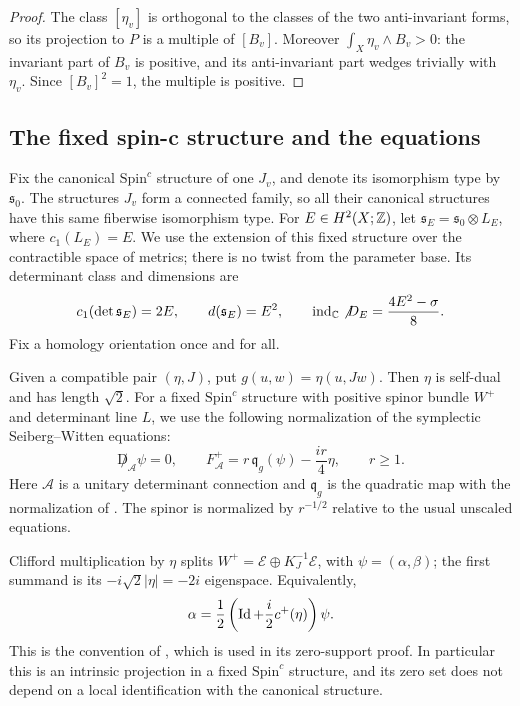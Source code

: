 \begin{proof}
The class \([\eta_v]\) is orthogonal to the classes of the two
anti-invariant forms, so its projection to \(P\) is a multiple of
\([B_v]\).  Moreover
\(\int_X\eta_v\wedge B_v>0\): the invariant part of \(B_v\) is
positive, and its anti-invariant part wedges trivially with
\(\eta_v\).  Since \([B_v]^2=1\), the multiple is positive.
\end{proof}

\subsection{The fixed spin-c structure and the equations}

Fix the canonical \(\mathrm{Spin}^c\) structure of one \(J_v\),
and denote its isomorphism type by \(\mathfrak s_0\).
The structures \(J_v\) form a connected family, so all their
canonical structures have this same fiberwise isomorphism type.
For \(E\in H^2(X;\mathbb Z)\), let
\(\mathfrak s_E=\mathfrak s_0\otimes L_E\), where
\(c_1(L_E)=E\).
We use the extension of this fixed structure
over the contractible space of metrics; there is no twist from the
parameter base.  Its determinant class and dimensions are
\begin{equation}
 \label{eq:families-dimensions}
 c_1(\det\mathfrak s_E)=2E,
 \qquad d(\mathfrak s_E)=E^2,
 \qquad \operatorname{ind}_{\mathbb C}\not D_E
            =\frac{4E^2-\sigma}{8}.
\end{equation}
Fix a homology orientation once and for all.

Given a compatible pair \((\eta,J)\), put
\(g(u,w)=\eta(u,Jw)\).  Then \(\eta\) is self-dual and has length
\(\sqrt2\).  For a fixed \(\mathrm{Spin}^c\) structure with positive
spinor bundle \(W^+\) and determinant line \(L\), we use the
following normalization of the symplectic Seiberg--Witten equations:
\begin{equation}
 \label{eq:families-taubes-equations}
 \not D_{\mathcal A}\psi=0,
 \qquad
 F_{\mathcal A}^{+}
   =r\,\mathfrak q_g(\psi)-\frac{ir}{4}\eta,
 \qquad r\ge1.
\end{equation}
Here \(\mathcal A\) is a unitary determinant connection and
\(\mathfrak q_g\) is the quadratic map with the normalization of
\cite[Equation~(2.9)]{Taubes1999}.  The spinor is normalized by
\(r^{-1/2}\) relative to the usual unscaled equations.

Clifford multiplication by \(\eta\) splits
\(W^+=\mathcal E\oplus K_J^{-1}\mathcal E\), with
\(\psi=(\alpha,\beta)\); the first summand is its
\(-i\sqrt2|\eta|=-2i\) eigenspace.  Equivalently,
\begin{equation}
 \label{eq:families-first-component}
\alpha=\frac12\left(\operatorname{Id}+\frac i2c^+(\eta)\right)\psi.
\end{equation}
This is the convention of \cite[Equation~(3.17) and
Section~6]{Taubes1999}, which is used in its zero-support proof.
In particular this is an intrinsic projection in a fixed
\(\mathrm{Spin}^c\) structure, and its zero set does not depend on
a local identification with the canonical structure.

